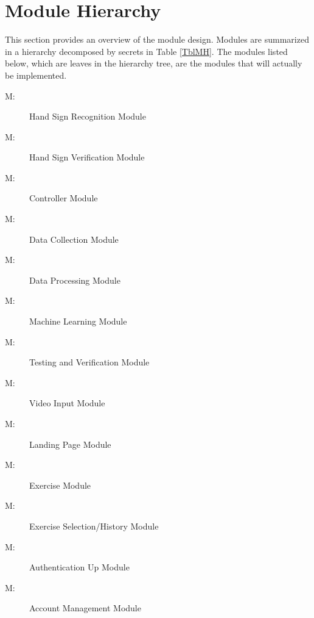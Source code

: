 \documentclass[12pt, titlepage]{article}
\newcounter{mnum}
\newcommand{\mthemnum}{M\themnum}
\begin{document}
\section{Module Hierarchy} \label{SecMH}

This section provides an overview of the module design. Modules are summarized
in a hierarchy decomposed by secrets in Table \ref{TblMH}. The modules listed
below, which are leaves in the hierarchy tree, are the modules that will
actually be implemented.

\begin{description}
\item [ \mthemnum \label{m1}:] Hand Sign Recognition Module
\item [ \mthemnum \label{m2}:] Hand Sign Verification Module
\item [ \mthemnum \label{m3}:] Controller Module
\item [ \mthemnum \label{m4}:] Data Collection Module
\item [ \mthemnum \label{m5}:] Data Processing Module
\item [ \mthemnum \label{m6}:] Machine Learning Module
\item [ \mthemnum \label{m7}:] Testing and Verification Module
\item [ \mthemnum \label{m8}:] Video Input Module
\item [ \mthemnum \label{m9}:] Landing Page Module
\item [ \mthemnum \label{m10}:] Exercise Module
\item [ \mthemnum \label{m11}:] Exercise Selection/History Module
\item [ \mthemnum \label{m12}:] Authentication Up Module
\item [ \mthemnum \label{m13}:] Account Management Module
\end{description}
\end{document}
